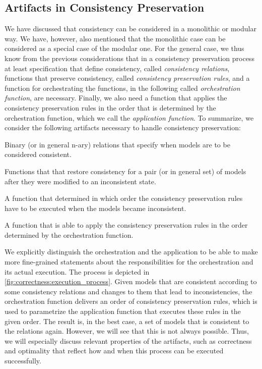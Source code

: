 \subsection{Artifacts in Consistency Preservation}

We have discussed that consistency can be considered in a monolithic or modular way. We have, however, also mentioned that the monolithic case can be considered as a special case of the modular one.
For the general case, we thus know from the previous considerations that in a consistency preservation process at least specification that define consistency, called \emph{\glspl{consistency relation}}, functions that preserve consistency, called \emph{\glspl{consistency preservation rule}}, and a function for orchestrating the functions, in the following called \emph{\gls{orchestration function}}, are necessary. Finally, we also need a function that applies the \glspl{consistency preservation rule} in the order that is determined by the orchestration function, which we call the \emph{\gls{application function}}.
To summarize, we consider the following artifacts necessary to handle consistency preservation:
\begin{properdescription}
    \item[\Glspl{consistency relation}:] Binary (or in general n-ary) relations that specify when models are to be considered consistent.
    \item[\Glspl{consistency preservation rule}:] Functions that that restore consistency for a pair (or in general set) of models after they were modified to an inconsistent state.
    \item[\Gls{orchestration function}:] A function that determined in which order the consistency preservation rules have to be executed when the models became inconsistent.
    \item[\Gls{application function}:] A function that is able to apply the consistency preservation rules in the order determined by the orchestration function. 
\end{properdescription}

We explicitly distinguish the orchestration and the application to be able to make more fine-grained statements about the responsibilities for the orchestration and its actual execution.
The process is depicted in \autoref{fig:correctness:execution_process}. Given models that are consistent according to some consistency relations and changes to them that lead to inconsistencies, the orchestration function delivers an order of consistency preservation rules, which is used to parametrize the application function that executes these rules in the given order.
The result is, in the best case, a set of models that is consistent to the relations again.
However, we will see that this is not always possible. Thus, we will especially discuss relevant properties of the artifacts, such as correctness and optimality that reflect how and when this process can be executed successfully.

